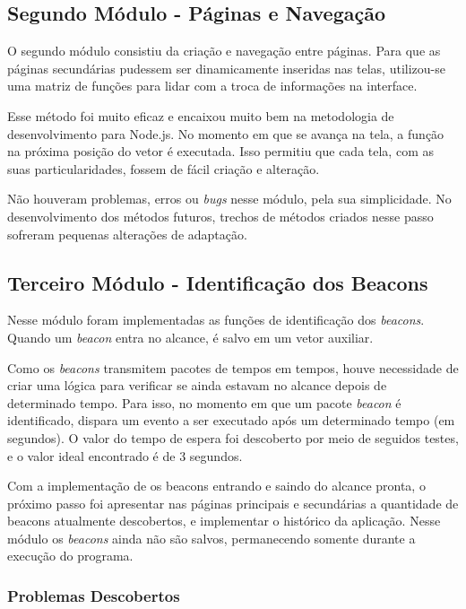 \documentclass[
		12pt,				%
		openright,			%
		oneside,			%
		a4paper,			%
		chapter=TITLE,		%
		english,			%
		brazil				%
	]{abntex2}
\begin{document}
\subsection{Segundo Módulo - Páginas e Navegação}\label{sec:segundo-modulo}

O segundo módulo consistiu da criação e navegação entre páginas. Para que as páginas secundárias pudessem ser dinamicamente inseridas nas telas, utilizou-se uma matriz de funções para lidar com a troca de informações na interface. 

Esse método foi muito eficaz e encaixou muito bem na metodologia de desenvolvimento para Node.js. No momento em que se avança na tela, a função na próxima posição do vetor é executada. Isso permitiu que cada tela, com as suas particularidades, fossem de fácil criação e alteração.

Não houveram problemas, erros ou \textit{bugs} nesse módulo, pela sua simplicidade. No desenvolvimento dos métodos futuros, trechos de métodos criados nesse passo sofreram pequenas alterações de adaptação.

\subsection{Terceiro Módulo - Identificação dos Beacons}\label{sec:terceiro-modulo}

Nesse módulo foram implementadas as funções de identificação dos \textit{beacons}. Quando um \textit{beacon} entra no alcance, é salvo em um vetor auxiliar. 

Como os \textit{beacons} transmitem pacotes de tempos em tempos, houve necessidade de criar uma lógica para verificar se ainda estavam no alcance depois de determinado tempo. Para isso, no momento em que um pacote \textit{beacon} é identificado, dispara um evento a ser executado após um determinado tempo (em segundos). O valor do tempo de espera foi descoberto por meio de seguidos testes, e o valor ideal encontrado é de 3 segundos.

Com a implementação de os beacons entrando e saindo do alcance pronta, o próximo passo foi apresentar nas páginas principais e secundárias a quantidade de beacons atualmente descobertos, e implementar o histórico da aplicação. Nesse módulo os \textit{beacons} ainda não são salvos, permanecendo somente durante a execução do programa.

\subsubsection{Problemas Descobertos}\label{sec:problema-quarto-modulo}
\end{document}
